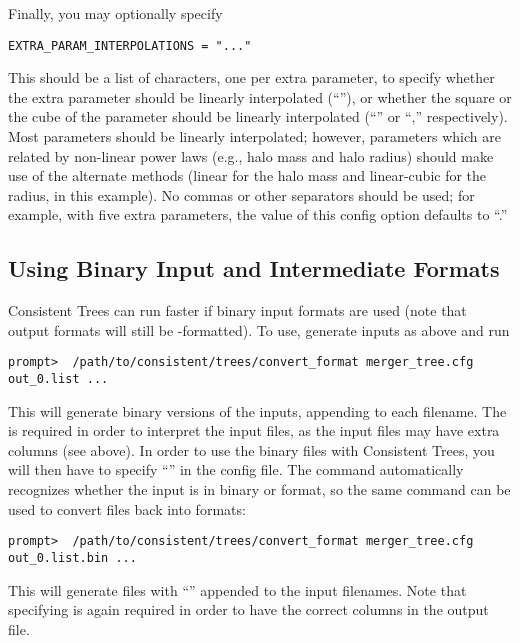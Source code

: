 \documentclass[12pt]{article}
\begin{document}
      Finally, you may optionally specify
\begin{verbatim}
EXTRA_PARAM_INTERPOLATIONS = "..."
\end{verbatim}
      This should be a list of characters, one per extra parameter, to specify
      whether the extra parameter should be linearly interpolated (``''),
      or whether the square or the cube of the parameter should be linearly
      interpolated (``'' or ``,'' respectively).  Most parameters should be
      linearly interpolated; however, parameters which are related by non-linear
      power laws (e.g., halo mass and halo radius) should make use of the
      alternate methods (linear for the halo mass and linear-cubic for the
      radius, in this example).  No commas or other separators should be used;
      for example, with five extra parameters, the value of this config
      option defaults to ``.''
      
  \subsection{Using Binary Input and Intermediate Formats}
  Consistent Trees can run faster if binary input formats are used (note that output formats
  will still be -formatted).  To use, generate  inputs as above
  and run
\begin{verbatim}
prompt>  /path/to/consistent/trees/convert_format merger_tree.cfg out_0.list ...
\end{verbatim}  	
  This will generate binary versions of the  inputs, appending  to each filename.
  The  is required in order to interpret the input files, as the input files
  may have extra columns (see  above).  In order to use the binary files
  with Consistent Trees, you will then have to specify ``'' in the
  config file.  The  command automatically recognizes whether the input
  is in binary or  format, so the same command can be used to convert files back into
   formats:
\small
\begin{verbatim}
prompt>  /path/to/consistent/trees/convert_format merger_tree.cfg out_0.list.bin ...
\end{verbatim}  	
\normalsize
  This will generate  files with ``'' appended to the input filenames. Note that
  specifying  is again required in order to have the correct columns in the
  output file.
      
\end{document}
